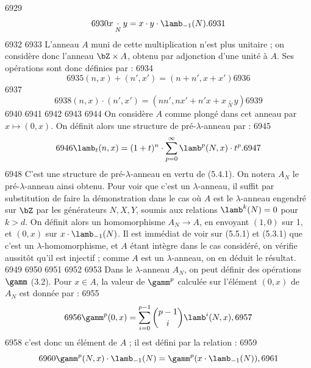   6929	\begin{equation}
  6930	x \underset{N}{\cdot} y = x \cdot y \cdot \lamb_{-1}(N).
  6931	\end{equation}
  6932	
  6933	L'anneau $A$ muni de cette multiplication n'est plus unitaire ; on consid\`ere donc l'anneau $\bZ \times A$, obtenu par adjonction d'une unit\'e \`a $A$. Ses op\'erations sont donc d\'efinies par :
  6934	\[
  6935	(n,x) + (n',x') = (n+n', x+x')
  6936	\]
  6937	\begin{equation}
  6938	(n,x) \cdot (n',x') = (nn', nx' + n'x + x \underset{N}{\cdot} y)
  6939	\end{equation}
  6940	
  6941	%
  6942	%
  6943	%
  6944	On consid\`ere $A$ comme plong\'e dans cet anneau par $x \mapsto (0,x)$. On d\'efinit alors une structure de pr\'e-$\lambda$-anneau par :
  6945	\begin{equation}
  6946	\lamb_t(n,x) = (1+t)^n \cdot \sum_{p=0}^{\infty} \lamb^p(N,x) \cdot t^p.
  6947	\end{equation}
  6948	C'est une structure de pr\'e-$\lambda$-anneau en vertu de (5.4.1). On notera $A_N$ le pr\'e-$\lambda$-anneau ainsi obtenu. Pour voir que c'est un $\lambda$-anneau, il suffit par substitution de faire la d\'emonstration dans le cas o\`u $A$ est le $\lambda$-anneau engendr\'e sur $\bZ$ par les g\'en\'erateurs $N, X, Y$, soumis aux relations $\lamb^k(N) = 0$ pour $k > d$. On d\'efinit alors un homomorphisme $A_N \to A$, en envoyant $(1,0)$ sur 1, et $(0,x)$ sur $x \cdot \lamb_{-1}(N)$. Il est imm\'ediat de voir sur (5.5.1) et (5.3.1) que c'est un $\lambda$-homomorphisme, et $A$ \'etant int\`egre dans le cas consid\'er\'e, on v\'erifie aussit\^ot qu'il est injectif ; comme $A$ est un $\lambda$-anneau, on en d\'eduit le r\'esultat.
  6949	
  6950	%
  6951	%
  6952	%
  6953		Dans le $\lambda$-anneau $A_N$, on peut d\'efinir des op\'erations $\gamm$ (3.2). Pour $x \in A$, la valeur de $\gamm^p$ calcul\'ee sur l'\'el\'ement $(0,x)$ de $A_N$ est donn\'ee par :
  6955	\[
  6956	\gamm^p(0,x) = \sum_{i=0}^{p-1} \binom{p-1}{i} \lamb^i(N,x),
  6957	\]
  6958	c'est donc un \'el\'ement de $A$ ; il est d\'efini par la relation :
  6959	\begin{equation}
  6960	\gamm^p(N,x) \cdot \lamb_{-1}(N) = \gamm^p(x \cdot \lamb_{-1}(N)),
  6961	\end{equation}
